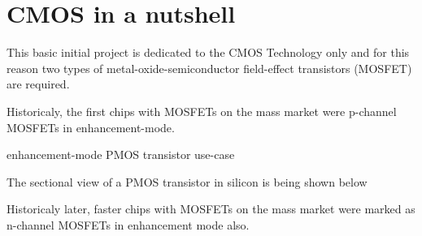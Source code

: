 \chapter{CMOS in a nutshell}

This basic initial project is dedicated to the CMOS Technology only and for this reason two types of metal-\-oxide-\-semiconductor field-\-effect transistors (MOSFET) are required.

Historicaly, the first chips with MOSFETs on the mass market were p-channel MOSFETs in enhancement-mode.

\begin{center}
    enhancement-mode PMOS transistor use-case
    \begin{figure}[h] %
        \centering
        \begin{circuitdiagram}{20}{20}
        \end{circuitdiagram}
    \end{figure}
\end{center}

The sectional view of a PMOS transistor in silicon is being shown below

Historicaly later, faster chips with MOSFETs on the mass market were marked as n-channel MOSFETs in enhancement mode also.

